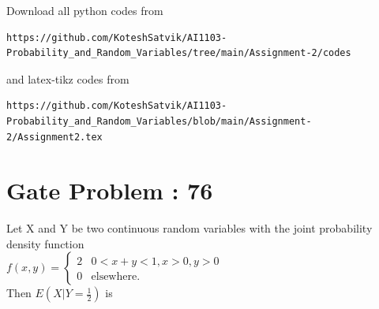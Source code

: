 \documentclass[journal,12pt,twocolumn]{IEEEtran}
\begin{document}
\author{Songa Kotesh Satvik}
\maketitle
\newpage
\bigskip
\renewcommand{\thefigure}{\theenumi}
\renewcommand{\thetable}{\theenumi}
Download all python codes from 
\begin{lstlisting}
https://github.com/KoteshSatvik/AI1103-Probability_and_Random_Variables/tree/main/Assignment-2/codes
\end{lstlisting}
%
and latex-tikz codes from 
%
\begin{lstlisting}
https://github.com/KoteshSatvik/AI1103-Probability_and_Random_Variables/blob/main/Assignment-2/Assignment2.tex
\end{lstlisting}
\section{\textbf{Gate Problem : 76}}
Let X and Y be two continuous random variables with the joint probability density function \\
$
f(x,y)= 
\begin{cases}
2 & 0<x+y<1, x>0, y>0 \\
0 & \text{elsewhere}.
\end{cases}
$
\\Then $E(X|Y=\frac{1}{2})$ is 
\end{document}
